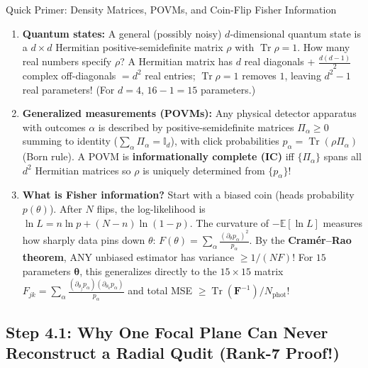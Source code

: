 \documentclass[10pt,letterpaper]{article}
\numberwithin{equation}{section}
\begin{document}
\begin{foundationbox}{Quick Primer: Density Matrices, POVMs, and Coin-Flip Fisher Information}
\begin{enumerate}[leftmargin=1.4em,itemsep=1pt,topsep=1pt]
  \item \textbf{Quantum states:} A general (possibly noisy) $d$-dimensional quantum state is a $d\times d$ Hermitian positive-semidefinite matrix $\rho$ with $\operatorname{Tr}\rho = 1$. How many real numbers specify $\rho$? A Hermitian matrix has $d$ real diagonals + $\frac{d(d-1)}{2}$ complex off-diagonals $= d^2$ real entries; $\operatorname{Tr}\rho = 1$ removes $1$, leaving $d^2 - 1$ real parameters! (For $d = 4$, $16 - 1 = 15$ parameters.)
  \item \textbf{Generalized measurements (POVMs):} Any physical detector apparatus with outcomes $\alpha$ is described by positive-semidefinite matrices $\Pi_\alpha \ge 0$ summing to identity ($\sum_\alpha \Pi_\alpha = \mathbb{I}_d$), with click probabilities $p_\alpha = \operatorname{Tr}(\rho\Pi_\alpha)$ (Born rule). A POVM is \textbf{informationally complete (IC)} iff $\{\Pi_\alpha\}$ spans all $d^2$ Hermitian matrices so $\rho$ is uniquely determined from $\{p_\alpha\}$!
  \item \textbf{What is Fisher information?} Start with a biased coin (heads probability $p(\theta)$). After $N$ flips, the log-likelihood is $\ln L = n\ln p + (N-n)\ln(1-p)$. The curvature of $-\mathbb{E}[\ln L]$ measures how sharply data pins down $\theta$: $F(\theta) = \sum_\alpha \frac{(\partial_\theta p_\alpha)^2}{p_\alpha}$. By the \textbf{Cram\'er--Rao theorem}, ANY unbiased estimator has variance $\ge 1/(N F)$! For $15$ parameters $\boldsymbol{\theta}$, this generalizes directly to the $15\times 15$ matrix $F_{jk} = \sum_\alpha \frac{(\partial_{\theta_j} p_\alpha)(\partial_{\theta_k} p_\alpha)}{p_\alpha}$ and total MSE $\ge \operatorname{Tr}(\mathbf{F}^{-1})/N_{\mathrm{phot}}$!
\end{enumerate}
\end{foundationbox}

\subsection{Step 4.1: Why One Focal Plane Can Never Reconstruct a Radial Qudit (Rank-7 Proof!)}
\end{document}
